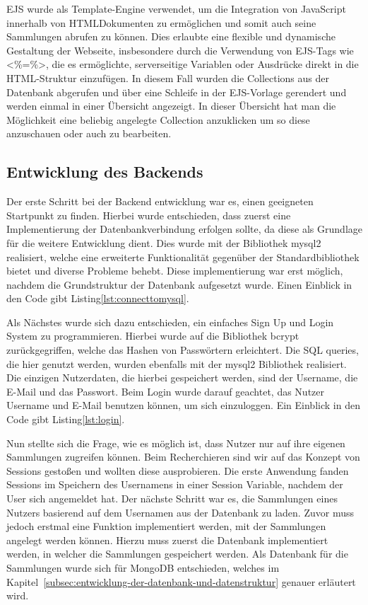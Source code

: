 EJS wurde als Template-Engine verwendet, um die Integration von JavaScript innerhalb von HTMLDokumenten zu ermöglichen und somit auch seine Sammlungen abrufen zu können.
Dies erlaubte eine flexible und dynamische Gestaltung der Webseite, insbesondere durch die Verwendung von EJS-Tags wie \grqq\textless{}\%=\%\textgreater{}\grqq{}, die es ermöglichte, serverseitige Variablen oder Ausdrücke direkt in die HTML-Struktur einzufügen.
In diesem Fall wurden die Collections aus der Datenbank abgerufen und über eine Schleife in der EJS-Vorlage gerendert und werden einmal in einer Übersicht angezeigt.
In dieser Übersicht hat man die Möglichkeit eine beliebig angelegte Collection anzuklicken um so diese anzuschauen oder auch zu bearbeiten.

\subsection{Entwicklung des Backends}\label{subsec:EntwicklungDesBackends}
Der erste Schritt bei der Backend entwicklung war es, einen geeigneten Startpunkt zu finden.
Hierbei wurde entschieden, dass zuerst eine Implementierung der Datenbankverbindung erfolgen sollte, da diese als Grundlage für die weitere Entwicklung dient.
Dies wurde mit der Bibliothek mysql2 realisiert, welche eine erweiterte Funktionalität gegenüber der Standardbibliothek bietet und diverse Probleme behebt.
Diese implementierung war erst möglich, nachdem die Grundstruktur der Datenbank aufgesetzt wurde.
Einen Einblick in den Code gibt Listing\ref{lst:connecttomysql}.



Als Nächstes wurde sich dazu entschieden, ein einfaches Sign Up und Login System zu programmieren.
Hierbei wurde auf die Bibliothek bcrypt zurückgegriffen, welche das Hashen von Passwörtern erleichtert.
Die SQL queries, die hier genutzt werden, wurden ebenfalls mit der mysql2 Bibliothek realisiert.
Die einzigen Nutzerdaten, die hierbei gespeichert werden, sind der Username, die E-Mail und das Passwort.
Beim Login wurde darauf geachtet, das Nutzer Username und E-Mail benutzen können, um sich einzuloggen.
Ein Einblick in den Code gibt Listing\ref{lst:login}.



Nun stellte sich die Frage, wie es möglich ist, dass Nutzer nur auf ihre eigenen Sammlungen zugreifen können.
Beim Recherchieren sind wir auf das Konzept von Sessions gestoßen und wollten diese ausprobieren.
Die erste Anwendung fanden Sessions im Speichern des Usernamens in einer Session Variable, nachdem der User sich angemeldet hat.
Der nächste Schritt war es, die Sammlungen eines Nutzers basierend auf dem Usernamen aus der Datenbank zu laden.
Zuvor muss jedoch erstmal eine Funktion implementiert werden, mit der Sammlungen angelegt werden können.
Hierzu muss zuerst die Datenbank implementiert werden, in welcher die Sammlungen gespeichert werden.
Als Datenbank für die Sammlungen wurde sich für MongoDB entschieden, welches im Kapitel~\ref{subsec:entwicklung-der-datenbank-und-datenstruktur} genauer erläutert wird.


